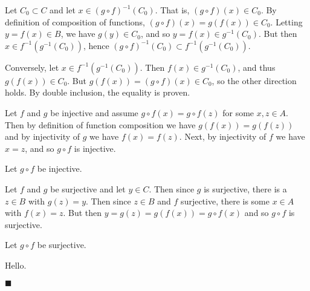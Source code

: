 \documentclass[12pt]{article}
\renewcommand{\qed}{\hfill$\blacksquare$}
\renewenvironment{proof}{\begin{addmargin}[1em]{0em}\begin{newproof}}{\end{newproof}\end{addmargin}\qed}
\newenvironment{theorem}[2][Theorem]{\begin{trivlist}
\item[\hskip \labelsep {\bfseries #1}\hskip \labelsep {\bfseries #2}]}{\end{trivlist}}
\begin{document}
\begin{proof}
\begin{enumerate}[label=(\alph*)]
	\item Let $C_0 \subset C$ and let $x \in \left(g \circ f\right)^{-1} \left(C_0\right)$. That is, $\left(g \circ f\right)\left(x\right) \in C_0$. By definition of composition of functions, $\left(g \circ f\right)\left(x\right) = g\left(f\left(x\right)\right) \in C_0$. Letting $y = f\left(x\right) \in B$, we have $g\left(y\right) \in C_0$, and so $y = f\left(x\right) \in g^{-1}\left(C_0\right)$. But then $x \in f^{-1}\left( g^{-1}\left(C_0\right)\right)$, hence $\left(g\circ f\right)^{-1}\left(C_0\right) \subset f^{-1}\left(g^{-1}\left(C_0\right)\right)$.
	
	Conversely, let $x\in f^{-1}\left(g^{-1}\left(C_0\right)\right)$. Then $f\left(x\right) \in g^{-1}\left(C_0\right)$, and thus $g\left(f\left(x\right)\right) \in C_0$. But $g\left(f\left(x\right)\right) = \left(g\circ f\right)\left(x\right) \in C_0$, so the other direction holds. By double inclusion, the equality is proven.
	
	\item Let $f$ and $g$ be injective and assume $g\circ f\left(x\right) = g \circ f \left(z\right)$ for some $x,z \in A$. Then by definition of function composition we have $g \left(f \left(x\right)\right) = g\left(f\left(z\right)\right)$ and by injectivity of $g$ we have $f\left(x\right) = f\left(z\right)$. Next, by injectivity of $f$ we have $x = z$, and so $g\circ f $ is injective.
	
	\item Let $g\circ f$ be injective. 
	
	\item Let $f$ and $g$ be surjective and let $y \in C$. Then since $g$ is surjective, there is a $z \in B$ with $g\left(z\right) = y$. Then since $z \in B$ and $f$ surjective, there is some $x \in A$ with $f\left(x\right) = z$. But then $y = g\left(z\right) = g\left(f\left(x\right)\right) = g \circ f \left(x\right)$ and so $g\circ f$ is surjective.
	
	\item Let $g\circ f$ be surjective.
	
	\item \begin{theorem}{}
	Hello.
	\end{theorem}
\end{enumerate}
\end{proof}
\end{document}
